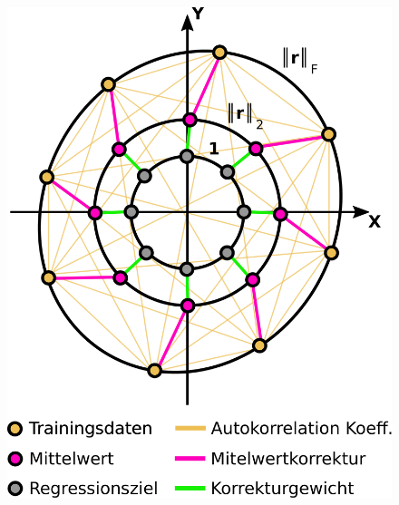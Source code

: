 \documentclass{beamer}
\begin{document}
\begin{frame}
\begin{columns}[c]
\begin{figure}
\begin{overprint}
			\includegraphics[width=\linewidth]{images/GPR_Mapping_Mean}
		\end{overprint}
	\end{figure}
\end{columns}
\end{frame}
\end{document}
